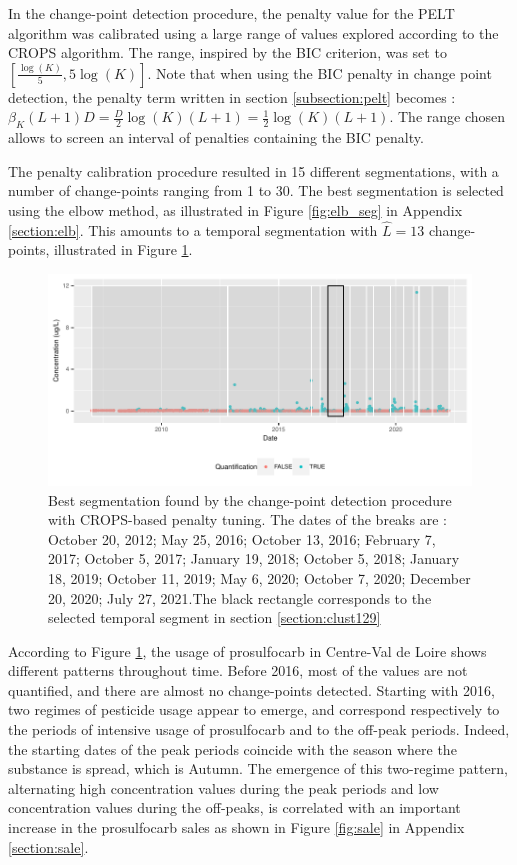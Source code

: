 In the change-point detection procedure, the penalty value for the PELT algorithm was calibrated using a large range of values explored according to the CROPS algorithm. The range, inspired by the BIC criterion, was set to $[\frac{\log(K)}{5},5\log(K)]$. Note that when using the BIC penalty in change point detection, the penalty term written in section \ref{subsection:pelt} becomes : $\beta_K(L+1)D = \frac{D}{2}\log(K)(L+1) = \frac{1}{2}\log(K)(L+1)$. The range chosen allows to screen an interval of penalties containing the BIC penalty.

The penalty calibration procedure resulted in 15 different segmentations, with a number of change-points ranging from 1 to 30. The best segmentation is selected using the elbow method, as illustrated in Figure \ref{fig:elb_seg} in Appendix \ref{section:elb}. This amounts to a temporal segmentation with $\hat L=13$ change-points, illustrated in Figure \ref{fig:seg}. 
 
\begin{figure}[ht]
  \centering
  \includegraphics[]{figs/Chap5/Seg_opt.pdf}
  \caption{Best segmentation found by the change-point detection procedure with CROPS-based penalty tuning. The dates of the breaks are : October 20, 2012; May 25, 2016; October 13, 2016; February 7, 2017; October 5, 2017; January 19, 2018; October 5, 2018; January 18, 2019; October 11, 2019; May 6, 2020; October 7, 2020; December 20, 2020; July 27, 2021.The black rectangle corresponds to the selected temporal segment in section \ref{section:clust129}}\label{fig:seg}
\end{figure}

According to Figure \ref{fig:seg}, the usage of prosulfocarb in Centre-Val de Loire shows different patterns throughout time. Before 2016, most of the values are not quantified, and there are almost no change-points detected. Starting with 2016, two regimes of pesticide usage appear to emerge, and correspond respectively to the periods of intensive usage of prosulfocarb and to the off-peak periods. Indeed, the starting dates of the peak periods coincide with the season where the substance is spread, which is Autumn. The emergence of this two-regime pattern, alternating high concentration values during the peak periods and low concentration values during the off-peaks, is correlated with an important increase in the prosulfocarb sales as shown in Figure \ref{fig:sale} in Appendix \ref{section:sale}. 

